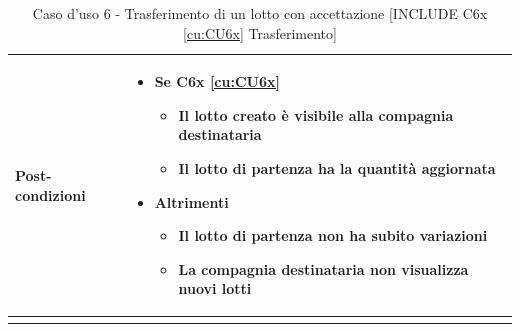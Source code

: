 \documentclass[a4paper,11pt]{article}
\begin{document}
\begin{longtable}{|p{2cm}|p{13cm}|}
  \\ \hline
  \textbf{Post-condizioni} &
  \begin{itemize}
    \item Se C6x \ref{cu:CU6x}
          \begin{itemize}
            \item Il lotto creato è visibile alla compagnia destinataria
            \item Il lotto di partenza ha la quantità aggiornata
          \end{itemize}
    \item Altrimenti
          \begin{itemize}
            \item Il lotto di partenza non ha subito variazioni
            \item La compagnia destinataria non visualizza nuovi lotti
          \end{itemize}
  \end{itemize}
  \\ \hline
  \caption{Caso d'uso 6 - Trasferimento di un lotto con accettazione [INCLUDE C6x \ref{cu:CU6x} Trasferimento]}
  \label{cu:CU6}
\end{longtable}
\end{document}
